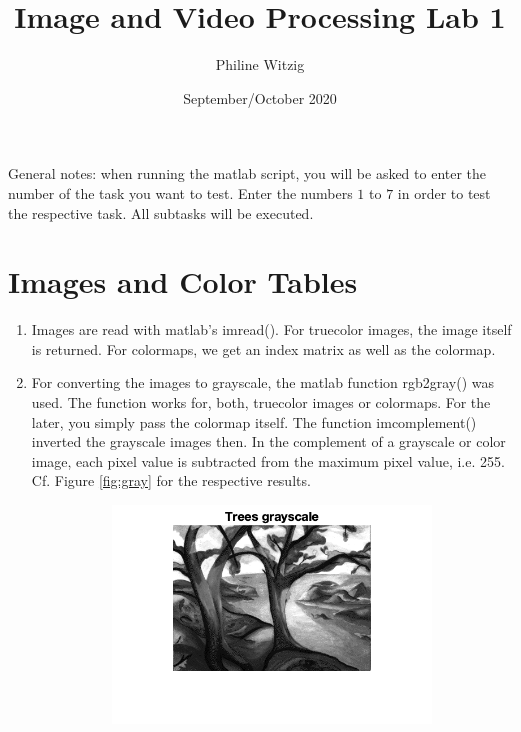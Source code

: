 \documentclass{article}
\title{Image and Video Processing Lab 1}
\author{Philine Witzig}
\date{September/October 2020}
\begin{document}
\maketitle

General notes: when running the matlab script, you will be asked to enter the number of the task you want to test. Enter the numbers $1$ to $7$ in order to test the respective task. All subtasks will be executed.
\section{Images and Color Tables}
\begin{enumerate}
    \item Images are read with matlab's imread(). For truecolor images, the image itself is returned. For colormaps, we get an index matrix as well as the colormap.
    \item For converting the images to grayscale, the matlab function rgb2gray() was used. The function works for, both, truecolor images or colormaps. For the later, you simply pass the colormap itself. The function imcomplement() inverted the grayscale images then. In the complement of a grayscale or color image, each pixel value is subtracted from the maximum pixel value, i.e. 255. Cf. Figure \ref{fig:gray} for the respective results.
    \begin{figure}
        \centering
        \begin{subfigure}[c]{0.45\textwidth}
            \includegraphics[width=\textwidth]{images/trees_gray.png}
        \end{subfigure}
        \hfill
        \begin{subfigure}[c]{0.45\textwidth}

\end{subfigure}
\end{figure}
\end{enumerate}
\end{document}
